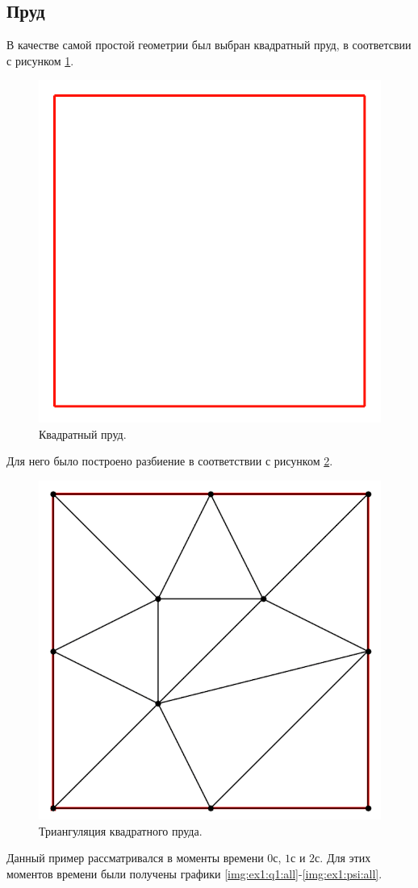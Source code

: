 \documentclass[14pt]{extreport}
\begin{document}
\subsection{Пруд}

В качестве самой простой геометрии был выбран квадратный пруд, в соответсвии с рисунком \ref{img:ex1:contour}.

\begin{figure}[H]
\centerline{
\includegraphics[width=0.5\linewidth]{images/ex1/contour}}
\caption{Квадратный пруд.}
\label{img:ex1:contour}
\end{figure}

Для него было построено разбиение в соответствии с рисунком \ref{img:ex1:mesh}.

\begin{figure}[H]
\centerline{
\includegraphics[width=0.5\linewidth]{images/ex1/mesh}}
\caption{Триангуляция квадратного пруда.}
\label{img:ex1:mesh}
\end{figure}


Данный пример рассматривался в моменты времени $0$с, $1$с и $2$с. Для этих моментов времени были получены графики \ref{img:ex1:q1:all}-\ref{img:ex1:psi:all}.
\end{document}
